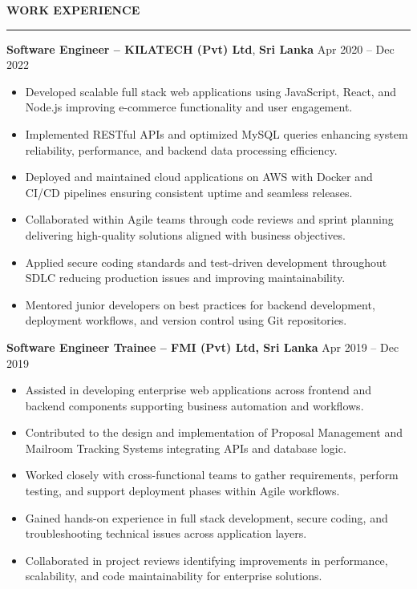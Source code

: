 \documentclass[10pt,letterpaper]{article}
\begin{document}
\textbf{WORK EXPERIENCE}\\[-8pt]
\noindent\rule{\textwidth}{1pt}

\vspace{-2pt}

\textbf{Software Engineer -- KILATECH (Pvt) Ltd}, \textbf{Sri Lanka} \hfill Apr 2020 -- Dec 2022

\vspace{-1pt}

\begin{itemize}
\item Developed scalable full stack web applications using JavaScript, React, and Node.js improving e-commerce functionality and user engagement.
\item Implemented RESTful APIs and optimized MySQL queries enhancing system reliability, performance, and backend data processing efficiency.
\item Deployed and maintained cloud applications on AWS with Docker and CI/CD pipelines ensuring consistent uptime and seamless releases.
\item Collaborated within Agile teams through code reviews and sprint planning delivering high-quality solutions aligned with business objectives.
\item Applied secure coding standards and test-driven development throughout SDLC reducing production issues and improving maintainability.
\item Mentored junior developers on best practices for backend development, deployment workflows, and version control using Git repositories.
\end{itemize}

\textbf{Software Engineer Trainee -- FMI (Pvt) Ltd, Sri Lanka} \hfill Apr 2019 -- Dec 2019

\vspace{-1pt}

\begin{itemize}
\item Assisted in developing enterprise web applications across frontend and backend components supporting business automation and workflows.
\item Contributed to the design and implementation of Proposal Management and Mailroom Tracking Systems integrating APIs and database logic.
\item Worked closely with cross-functional teams to gather requirements, perform testing, and support deployment phases within Agile workflows.
\item Gained hands-on experience in full stack development, secure coding, and troubleshooting technical issues across application layers.
\item Collaborated in project reviews identifying improvements in performance, scalability, and code maintainability for enterprise solutions.
\end{itemize}
\end{document}
